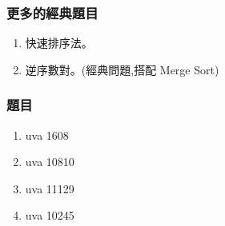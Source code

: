 \subsubsection{更多的經典題目}
\begin{enumerate}
\item 快速排序法。
\item 逆序數對。(經典問題,搭配 Merge Sort)
\end{enumerate}
\subsubsection{題目}
\begin{enumerate}
\item uva 1608
\item uva 10810
\item uva 11129
\item uva 10245
\end{enumerate}
